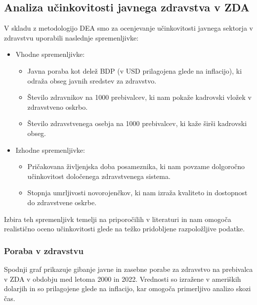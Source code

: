 \documentclass[12pt,a4paper]{article}
\theoremstyle{definition}
\begin{document}
\subsection{Analiza učinkovitosti javnega zdravstva v ZDA}

V skladu z metodologijo DEA smo za ocenjevanje učinkovitosti javnega sektorja v zdravstvu uporabili naslednje spremenljivke:

\begin{itemize}
\item Vhodne spremenljivke:
    \begin{itemize}
        \item Javna poraba kot delež BDP (v USD prilagojena glede na inflacijo), ki odraža obseg javnih sredstev za zdravstvo.
        \item Število zdravnikov na 1000 prebivalcev, ki nam pokaže kadrovski vložek v zdravstveno oskrbo.
        \item Število zdravstvenega osebja na 1000 prebivalcev, ki kaže širši kadrovski obseg.
    \end{itemize}
\item Izhodne spremenljivke:
    \begin{itemize}
        \item Pričakovana življenjska doba posameznika, ki nam povzame dolgoročno učinkovitost določenega zdravstvenega sistema.
        \item Stopnja umrljivosti novorojenčkov, ki nam izraža kvaliteto in dostopnost do zdravstvene oskrbe.
    \end{itemize}
\end{itemize}

Izbira teh spremenljivk temelji na priporočilih v literaturi \cite{Yaisawarng2002} in nam omogoča realistično oceno učinkovitosti glede na težko pridobljene razpoložljive podatke.

\subsubsection{Poraba v zdravstvu}

Spodnji graf prikazuje gibanje javne in zasebne porabe za zdravstvo na prebivalca v ZDA v obdobju med letoma 2000 in 2022. 
Vrednosti so izražene v ameriških dolarjih in so prilagojene glede na inflacijo, kar omogoča primerljivo analizo skozi čas.
\end{document}
